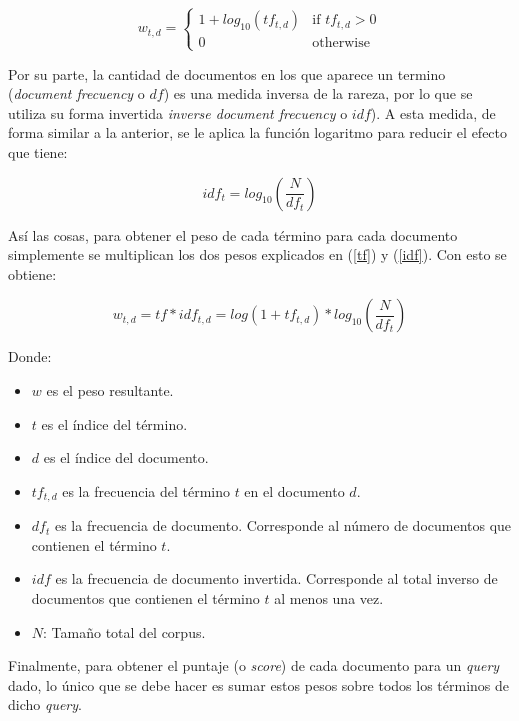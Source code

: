 \begin{equation}
    w_{t,d} = \begin{cases} 
            1 + log_{10}( tf_{t,d} ) &\mbox{if } tf_{t,d} > 0  \\
            0 & \mbox{otherwise }  
            \end{cases}
    \label{tf}
\end{equation}

Por su parte, la cantidad de documentos en los que aparece un termino (\textit{document frecuency} o $df$) es una medida inversa de la rareza, por lo que se utiliza su forma invertida \textit{inverse document frecuency} o $idf$). A esta medida, de forma similar a la anterior, se le aplica la función logaritmo para reducir el efecto que tiene:

\begin{equation}
    idf_t = log_{10} \left(\frac{N}{df_t}\right)
    \label{idf}
\end{equation}

Así las cosas, para obtener el peso de cada término para cada documento simplemente se multiplican los dos pesos explicados en (\ref{tf}) y (\ref{idf}). Con esto se obtiene: 

\begin{equation}
    w_{t,d} = tf * idf_{t,d} = log(1 + tf_{t,d}) * log_{10}\left(\frac{N}{df_t}\right)
    \label{eq:tfidf}
\end{equation}

Donde:
\begin{itemize}
    \item $w$ es el peso resultante.
    \item $t$ es el índice del término.
    \item $d$ es el índice del documento.
    \item $tf_{t,d}$ es la frecuencia del término $t$ en el documento $d$.
    \item $df_{t}$ es la frecuencia de documento. Corresponde al número de documentos que contienen el término $t$. 
    \item $idf$ es la frecuencia de documento invertida. Corresponde al total inverso de documentos que contienen el término $t$ al menos una vez.
    \item $N$: Tamaño total del corpus.
\end{itemize}

Finalmente, para obtener el puntaje (o \textit{score}) de cada documento para un \textit{query} dado, lo único que se debe hacer es sumar estos pesos sobre todos los términos de dicho \textit{query}.

